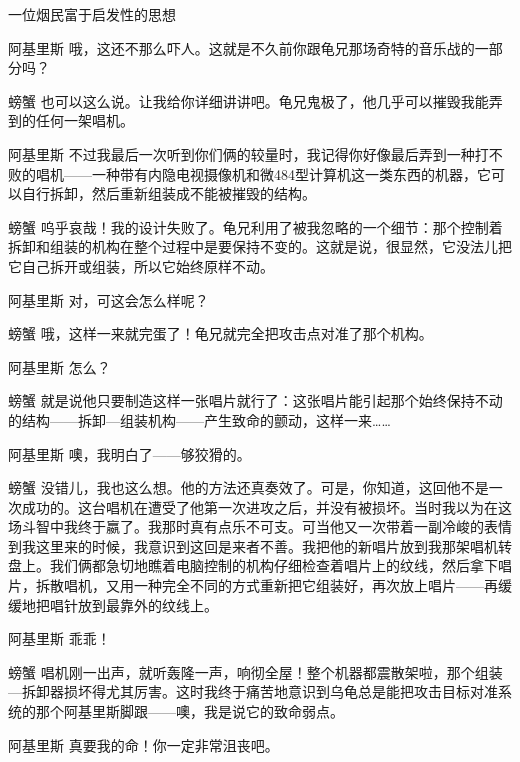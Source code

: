 \begin{dialog}{一位烟民富于启发性的思想}
\begin{dialogue}
\item[阿基里斯]哦，这还不那么吓人。这就是不久前你跟龟兄那场奇特的音乐战的一部分吗？

\item[螃蟹]也可以这么说。让我给你详细讲讲吧。龟兄鬼极了，他几乎可以摧毁我能弄到的任何一架唱机。

\item[阿基里斯]不过我最后一次听到你们俩的较量时，我记得你好像最后弄到一种打不败的唱机——一种带有内隐电视摄像机和微484型计算机这一类东西的机器，它可以自行拆卸，然后重新组装成不能被摧毁的结构。

\item[螃蟹]呜乎哀哉！我的设计失败了。龟兄利用了被我忽略的一个细节：那个控制着拆卸和组装的机构在整个过程中是要保持不变的。这就是说，很显然，它没法儿把它自己拆开或组装，所以它始终原样不动。

\item[阿基里斯]对，可这会怎么样呢？

\item[螃蟹]哦，这样一来就完蛋了！龟兄就完全把攻击点对准了那个机构。

\item[阿基里斯]怎么？

\item[螃蟹]就是说他只要制造这样一张唱片就行了：这张唱片能引起那个始终保持不动的结构——拆卸—组装机构——产生致命的颤动，这样一来……

\item[阿基里斯]噢，我明白了——够狡猾的。

\item[螃蟹]没错儿，我也这么想。他的方法还真奏效了。可是，你知道，这回他不是一次成功的。这台唱机在遭受了他第一次进攻之后，并没有被损坏。当时我以为在这场斗智中我终于嬴了。我那时真有点乐不可支。可当他又一次带着一副冷峻的表情到我这里来的时候，我意识到这回是来者不善。我把他的新唱片放到我那架唱机转盘上。我们俩都急切地瞧着电脑控制的机构仔细检查着唱片上的纹线，然后拿下唱片，拆散唱机，又用一种完全不同的方式重新把它组装好，再次放上唱片——再缓缓地把唱针放到最靠外的纹线上。

\item[阿基里斯]乖乖！

\item[螃蟹]唱机刚一出声，就听轰隆一声，响彻全屋！整个机器都震散架啦，那个组装—拆卸器损坏得尤其厉害。这时我终于痛苦地意识到乌龟总是能把攻击目标对准系统的那个阿基里斯脚跟——噢，我是说它的致命弱点。

\item[阿基里斯]真要我的命！你一定非常沮丧吧。


\end{dialogue}
\end{dialog}
